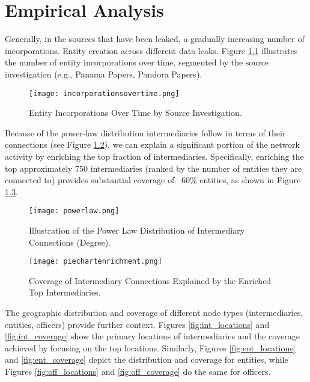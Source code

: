 \chapter{Empirical Analysis}
\label{chap:empirical_analysis}

Generally, in the sources that have been leaked, a gradually increasing number of incorporations. Entity creation across different data leaks. Figure \ref{fig:incorporations_time} illustrates the number of entity incorporations over time, segmented by the source investigation (e.g., Panama Papers, Pandora Papers).

\begin{figure}[htbp]
    \centering
    \texttt{[image: incorporationsovertime.png]}
    \caption{Entity Incorporations Over Time by Source Investigation.}
    \label{fig:incorporations_time}
\end{figure}

Because of the power-law distribution intermediaries follow in terms of their connections (see Figure \ref{fig:powerlaw_dist}), we can explain a significant portion of the network activity by enriching the top fraction of intermediaries. Specifically, enriching the top approximately 750 intermediaries (ranked by the number of entities they are connected to) provides substantial coverage of ~60\% entities, as shown in Figure \ref{fig:enrichment_coverage_pie}.

\begin{figure}[htbp]
    \centering
    \texttt{[image: powerlaw.png]}
    \caption{Illustration of the Power Law Distribution of Intermediary Connections (Degree).}
    \label{fig:powerlaw_dist}
\end{figure}

\begin{figure}[htbp]
    \centering
    \texttt{[image: piechartenrichment.png]}
    \caption{Coverage of Intermediary Connections Explained by the Enriched Top Intermediaries.}
    \label{fig:enrichment_coverage_pie}
\end{figure}

The geographic distribution and coverage of different node types (intermediaries, entities, officers) provide further context. Figures \ref{fig:int_locations} and \ref{fig:int_coverage} show the primary locations of intermediaries and the coverage achieved by focusing on the top locations. Similarly, Figures \ref{fig:ent_locations} and \ref{fig:ent_coverage} depict the distribution and coverage for entities, while Figures \ref{fig:off_locations} and \ref{fig:off_coverage} do the same for officers.

